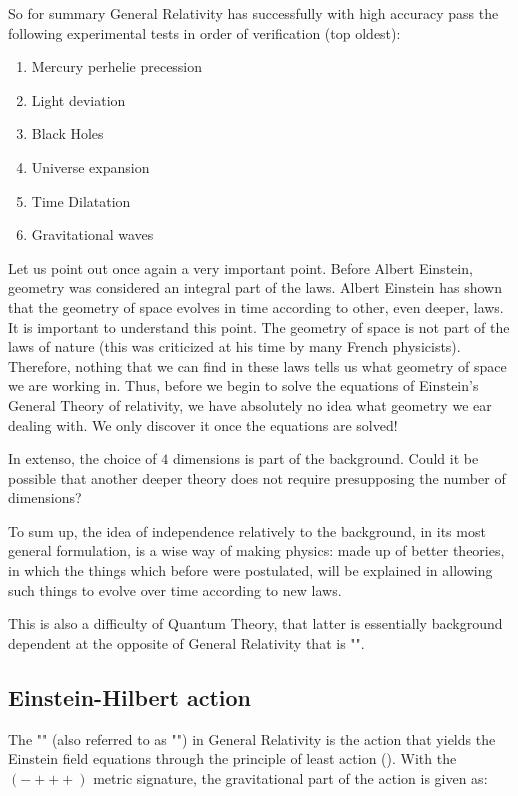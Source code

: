 	So for summary General Relativity has successfully with high accuracy pass the following experimental tests in order of verification (top oldest):
	\begin{enumerate}
		\item Mercury perhelie precession
		\item Light deviation
		\item Black Holes
		\item Universe expansion
		\item Time Dilatation
		\item Gravitational waves
	\end{enumerate}	

	Let us point out once again a very important point. Before Albert Einstein, geometry was considered an integral part of the laws. Albert Einstein has shown that the geometry of space evolves in time according to other, even deeper, laws. It is important to understand this point. The geometry of space is not part of the laws of nature (this was criticized at his time by many French physicists). Therefore, nothing that we can find in these laws tells us what geometry of space we are working in. Thus, before we begin to solve the equations of Einstein's General Theory of relativity, we have absolutely no idea what geometry we ear dealing with. We only discover it once the equations are solved!
	
	In extenso, the choice of $4$ dimensions is part of the background. Could it be possible that another deeper theory does not require presupposing the number of dimensions? 

	To sum up, the idea of independence relatively to the background, in its most general formulation, is a wise way of making physics: made up of better theories, in which the things which before were postulated, will be explained in allowing such things to evolve over time according to new laws.

	This is also a difficulty of Quantum Theory, that latter is essentially background dependent at the opposite of General Relativity that is "".
	
	\subsection{Einstein-Hilbert action}
	The "" (also referred to as "") in General Relativity is the action that yields the Einstein field equations through the principle of least action (). With the $(- + + +)$ metric signature, the gravitational part of the action is given as:
	
